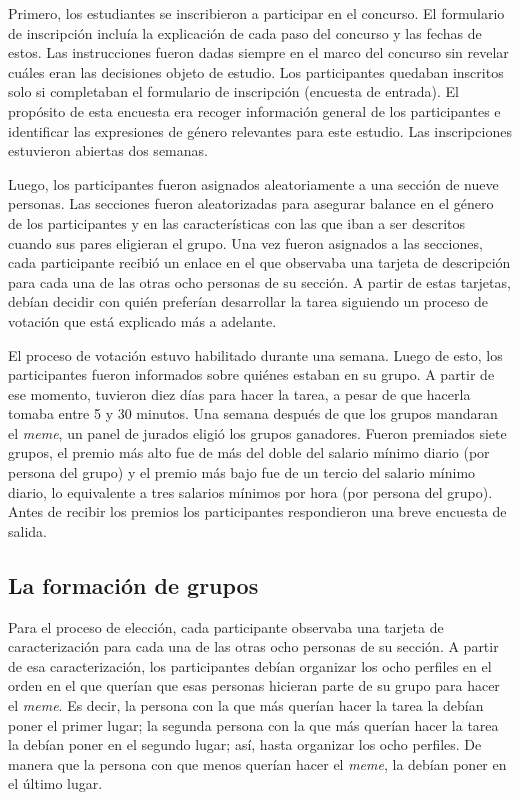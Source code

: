 Primero, los estudiantes se inscribieron a participar en el concurso. El formulario de inscripción incluía la explicación de cada paso del concurso y las fechas de estos. Las instrucciones fueron dadas siempre en el marco del concurso sin revelar cuáles eran las decisiones objeto de estudio. Los participantes quedaban inscritos solo si completaban el formulario de inscripción (encuesta de entrada). El propósito de esta encuesta era recoger información general de los participantes e identificar las expresiones de género relevantes para este estudio. Las inscripciones estuvieron abiertas dos semanas.

Luego, los participantes fueron asignados aleatoriamente a una sección de nueve personas. Las secciones fueron aleatorizadas para asegurar balance en el género de los participantes y en las características con las que iban a ser descritos cuando sus pares eligieran el grupo. Una vez fueron asignados a las secciones, cada participante recibió un enlace en el que observaba una tarjeta de descripción para cada una de las otras ocho personas de su sección. A partir de estas tarjetas, debían decidir con quién preferían desarrollar la tarea siguiendo un proceso de votación que está explicado más a adelante. 

El proceso de votación estuvo habilitado durante una semana. Luego de esto, los participantes fueron informados sobre quiénes estaban en su grupo. A partir de ese momento, tuvieron diez días para hacer la tarea, a pesar de que hacerla tomaba entre 5 y 30 minutos. Una semana después de que los grupos mandaran el \textit{meme}, un panel de jurados eligió los grupos ganadores. Fueron premiados siete grupos, el premio más alto fue de más del doble del salario mínimo diario (por persona del grupo) y el premio más bajo fue de un tercio del salario mínimo diario, lo equivalente a tres salarios mínimos por hora (por persona del grupo). Antes de recibir los premios los participantes respondieron una breve encuesta de salida.

\subsection{La formación de grupos}
Para el proceso de elección, cada participante observaba una tarjeta de caracterización para cada una de las otras ocho personas de su sección. A partir de esa caracterización, los participantes debían organizar los ocho perfiles en el orden en el que querían que esas personas hicieran parte de su grupo para hacer el \textit{meme}. Es decir, la persona con la que más querían hacer la tarea la debían poner el primer lugar; la segunda persona con la que más querían hacer la tarea la debían poner en el segundo lugar; así, hasta organizar los ocho perfiles. De manera que la persona con que menos querían hacer el \textit{meme}, la debían poner en el último lugar.

